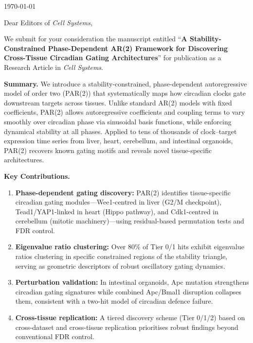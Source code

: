 \documentclass[11pt,letterpaper]{article}
\begin{document}
\today

\vspace{1cm}

Dear Editors of \textit{Cell Systems},

\vspace{0.5cm}

We submit for your consideration the manuscript entitled ``\textbf{A Stability-Constrained Phase-Dependent AR(2) Framework for Discovering Cross-Tissue Circadian Gating Architectures}'' for publication as a Research Article in \textit{Cell Systems}.

\vspace{0.3cm}

\textbf{Summary.} We introduce a stability-constrained, phase-dependent autoregressive model of order two (PAR(2)) that systematically maps how circadian clocks gate downstream targets across tissues. Unlike standard AR(2) models with fixed coefficients, PAR(2) allows autoregressive coefficients and coupling terms to vary smoothly over circadian phase via sinusoidal basis functions, while enforcing dynamical stability at all phases. Applied to tens of thousands of clock--target expression time series from liver, heart, cerebellum, and intestinal organoids, PAR(2) recovers known gating motifs and reveals novel tissue-specific architectures.

\vspace{0.3cm}

\textbf{Key Contributions.}
\begin{enumerate}
\item \textbf{Phase-dependent gating discovery:} PAR(2) identifies tissue-specific circadian gating modules---Wee1-centred in liver (G2/M checkpoint), Tead1/YAP1-linked in heart (Hippo pathway), and Cdk1-centred in cerebellum (mitotic machinery)---using residual-based permutation tests and FDR control.

\item \textbf{Eigenvalue ratio clustering:} Over 80\% of Tier 0/1 hits exhibit eigenvalue ratios clustering in specific constrained regions of the stability triangle, serving as geometric descriptors of robust oscillatory gating dynamics.

\item \textbf{Perturbation validation:} In intestinal organoids, Apc mutation strengthens circadian gating signatures while combined Apc/Bmal1 disruption collapses them, consistent with a two-hit model of circadian defence failure.

\item \textbf{Cross-tissue replication:} A tiered discovery scheme (Tier 0/1/2) based on cross-dataset and cross-tissue replication prioritises robust findings beyond conventional FDR control.
\end{enumerate}
\end{document}
